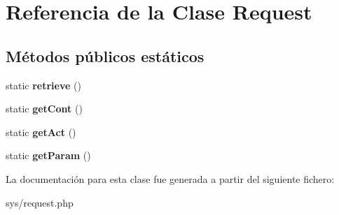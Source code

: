 \hypertarget{class_request}{}\section{Referencia de la Clase Request}
\label{class_request}
\subsection*{Métodos públicos estáticos}
\begin{DoxyCompactItemize}
\item 
\hypertarget{class_request_ad7c00fdbba951c6f593e1e81f83a9324}{}static {\bfseries retrieve} ()\label{class_request_ad7c00fdbba951c6f593e1e81f83a9324}

\item 
\hypertarget{class_request_a757eb52465094807a57e1604193c3957}{}static {\bfseries get\+Cont} ()\label{class_request_a757eb52465094807a57e1604193c3957}

\item 
\hypertarget{class_request_aa6d9c2b196225e95b4142166b936ef12}{}static {\bfseries get\+Act} ()\label{class_request_aa6d9c2b196225e95b4142166b936ef12}

\item 
\hypertarget{class_request_aff93c1546ca6a0a3a86cb21fab0ce5a5}{}static {\bfseries get\+Param} ()\label{class_request_aff93c1546ca6a0a3a86cb21fab0ce5a5}

\end{DoxyCompactItemize}


La documentación para esta clase fue generada a partir del siguiente fichero\+:\begin{DoxyCompactItemize}
\item 
sys/request.\+php\end{DoxyCompactItemize}
